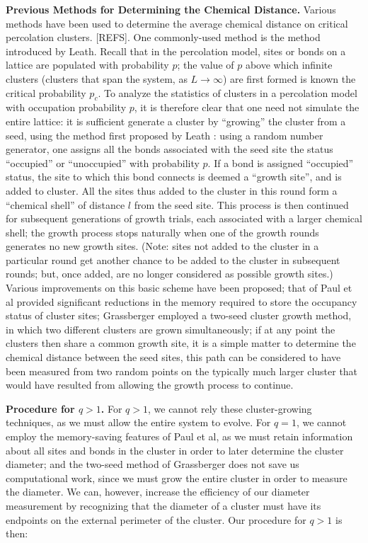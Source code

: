 \documentclass[pre,preprint,11pt]{revtex4}
\begin{document}
{\bf Previous Methods for Determining the Chemical Distance.} Various methods have been used to determine the average chemical distance on critical percolation clusters. [REFS].  One commonly-used method is the method introduced by Leath.  Recall that in the percolation model, sites or bonds on a lattice are populated with probability $p$; the value of $p$ above which infinite clusters (clusters that span the system, as $L \to \infty$) are first formed is known the critical probability $p_c$.  To analyze the statistics of clusters in a percolation model with occupation probability $p$, it is therefore clear that one need not simulate the entire lattice:  it is sufficient generate a cluster by ``growing'' the cluster from a seed, using the method first proposed by Leath \cite{Leath}: using a random number generator, one assigns all the bonds associated with the seed site the status ``occupied'' or ``unoccupied'' with probability $p$.  If a bond is assigned ``occupied'' status, the site to which this bond connects is deemed a ``growth site'', and is added to cluster.  All the sites thus added to the cluster in this round form a ``chemical shell'' of distance $l$ from the seed site.  This process is then continued for subsequent generations of growth trials, each associated with a larger chemical shell; the growth process stops naturally when one of the growth rounds generates no new growth sites.  (Note: sites not added to the cluster in a particular round get another chance to be added to the cluster in subsequent rounds; but, once added, are no longer considered as possible growth sites.) Various improvements on this basic scheme have been proposed; that of Paul et al \cite{Paul2001} provided significant reductions in the memory required to store the occupancy status of cluster sites; Grassberger\cite{Gr99} employed a two-seed cluster growth method, in which two different clusters are grown simultaneously; if at any point the clusters then share a common growth site, it is a simple matter to determine the chemical distance between the seed sites, this path can be considered to have been measured from two random points on the typically much larger cluster that would have resulted from allowing the growth process to continue.  

{\bf Procedure for $q>1$.} For $q>1$, we cannot rely these cluster-growing techniques, as we must allow the entire system to evolve. For $q=1$, we cannot  employ the memory-saving features of Paul et al, as we must retain information about all sites and bonds in the cluster in order to later determine the cluster diameter; and the two-seed method of Grassberger does not save us computational work, since we must grow the entire cluster in order to measure the diameter.  We can, however, increase the efficiency of our diameter measurement by recognizing that the diameter of a cluster must have its endpoints on the external perimeter of the cluster.  Our procedure for $q>1$ is then:
\end{document}

